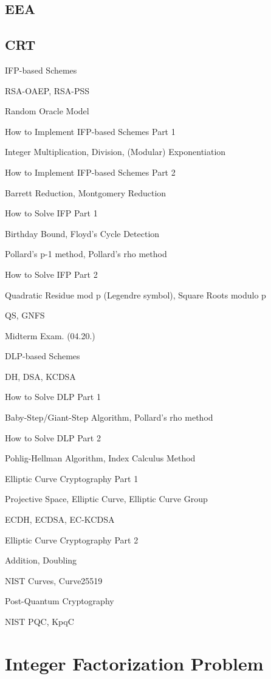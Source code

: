 \documentclass[12pt,openany]{book}
\begin{document}
	\section{EEA}
	\section{CRT}
	
	\newpage
	IFP-based Schemes
	
	RSA-OAEP, RSA-PSS
	
	Random Oracle Model
	
	
	How to Implement IFP-based Schemes Part 1
	
	Integer Multiplication, Division, (Modular) Exponentiation
	
	
	How to Implement IFP-based Schemes Part 2
	
	Barrett Reduction, Montgomery Reduction
	
	
	How to Solve IFP Part 1
	
	Birthday Bound, Floyd's Cycle Detection
	
	Pollard’s p-1 method, Pollard’s rho method
	
	
	How to Solve IFP Part 2
	
	Quadratic Residue mod p (Legendre symbol), Square Roots modulo p
	
	QS, GNFS
	
	
	Midterm Exam. (04.20.)
	
	
	DLP-based Schemes
	
	DH, DSA, KCDSA
	
	
	How to Solve DLP Part 1
	
	Baby-Step/Giant-Step Algorithm, Pollard’s rho method
	
	
	How to Solve DLP Part 2
	
	Pohlig-Hellman Algorithm, Index Calculus Method
	
	
	Elliptic Curve Cryptography Part 1
	
	Projective Space, Elliptic Curve, Elliptic Curve Group
	
	ECDH, ECDSA, EC-KCDSA
	
	
	Elliptic Curve Cryptography Part 2
	
	Addition, Doubling
	
	NIST Curves, Curve25519
	
	
	Post-Quantum Cryptography
	
	NIST PQC, KpqC
	
	
	\newpage
	\chapter{Integer Factorization Problem}
	
\end{document}
